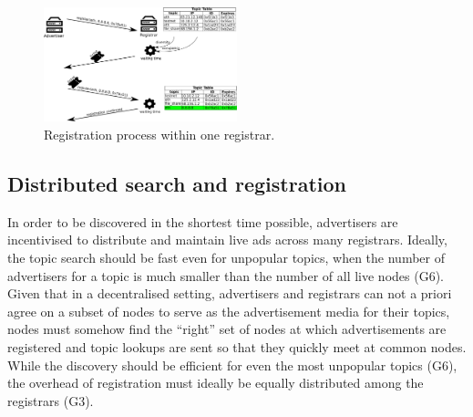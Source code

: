 \begin{figure}
    \includegraphics[width=0.5\textwidth]{img/registration}
    \caption{Registration process within one registrar.}
    \label{fig:registration}
\end{figure}


\subsection{Distributed search and registration}

In order to be discovered in the shortest time possible, advertisers are incentivised to distribute and maintain live ads across many registrars. Ideally, the topic search should be fast even for unpopular topics, \ie when the number of advertisers for a topic is much smaller than the number of all live nodes (G6). 
Given that in a decentralised setting, advertisers and registrars can not a priori agree on a subset of nodes to serve as the advertisement media for their topics, nodes must somehow find the ``right'' set of nodes at which advertisements are registered and topic lookups are sent so that they quickly meet at common nodes. While the discovery should be efficient for even the most unpopular topics (G6), the overhead of registration must ideally be equally distributed among the registrars (G3).

